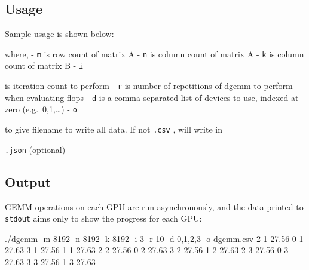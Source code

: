 \documentclass[
]{article}
\let\oldtexttt\texttt
\renewcommand{\texttt}[1]{
  \colorbox{Light}{\oldtexttt{#1}}
}
\newenvironment{Shaded}{}{}
\newcommand{\ExtensionTok}[1]{#1}
\newcommand{\FunctionTok}[1]{\textcolor[rgb]{0.02,0.16,0.49}{#1}}
\newcommand{\KeywordTok}[1]{\textcolor[rgb]{0.00,0.44,0.13}{\textbf{#1}}}
\newcommand{\NormalTok}[1]{#1}
\newcommand{\VariableTok}[1]{\textcolor[rgb]{0.10,0.09,0.49}{#1}}
\begin{document}
\hypertarget{usage}{%
\subsection{Usage}\label{usage}}

Sample usage is shown below:

\begin{Shaded}
\end{Shaded}

where, - \texttt{m} is row count of matrix A - \texttt{n} is column
count of matrix A - \texttt{k} is column count of matrix B - \texttt{i}
is iteration count to perform - \texttt{r} is number of repetitions of
dgemm to perform when evaluating flops - \texttt{d} is a comma separated
list of devices to use, indexed at zero (e.g.~0,1,\ldots) - \texttt{o}
to give filename to write all data. If not \texttt{.csv}, will write in
\texttt{.json} (optional)

\hypertarget{output}{%
\subsection{Output}\label{output}}

GEMM operations on each GPU are run asynchronously, and the data printed
to \texttt{stdout} aims only to show the progress for each GPU:

\begin{Shaded}
\begin{Highlighting}[]
\ExtensionTok{./dgemm}\NormalTok{ {-}m 8192 {-}n 8192 {-}k 8192 {-}i 3 {-}r 10 {-}d 0,1,2,3 {-}o dgemm.csv}
\ExtensionTok{2}\NormalTok{     1   27.56}
\ExtensionTok{0}\NormalTok{     1   27.63}
\ExtensionTok{3}\NormalTok{     1   27.56}
\ExtensionTok{1}\NormalTok{     1   27.63}
\ExtensionTok{2}\NormalTok{     2   27.56}
\ExtensionTok{0}\NormalTok{     2   27.63}
\ExtensionTok{3}\NormalTok{     2   27.56}
\ExtensionTok{1}\NormalTok{     2   27.63}
\ExtensionTok{2}\NormalTok{     3   27.56}
\ExtensionTok{0}\NormalTok{     3   27.63}
\ExtensionTok{3}\NormalTok{     3   27.56}
\ExtensionTok{1}\NormalTok{     3   27.63}
\end{Highlighting}
\end{Shaded}
\end{document}
